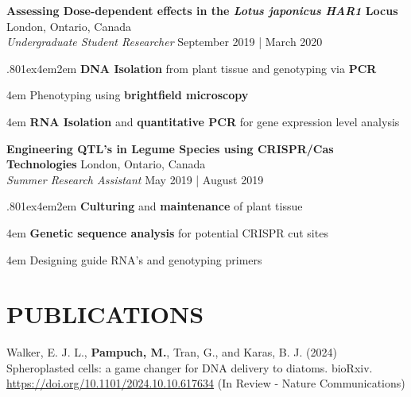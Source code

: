 \documentclass[a4paper,9pt]{extarticle}
\begin{document}
\noindent
\begin{minipage}{1\textwidth}
\setlength{\parindent}{15pt} %
	\noindent
	\textbf{Assessing Dose-dependent effects in the \textit{Lotus japonicus HAR1} Locus} \hfill London, Ontario, Canada\\ %
	\textit{Undergraduate Student Researcher}
	\hfill September 2019 | March 2020  \par %
	{\hsize.80\linewidth\parskip1ex\hangindent4em\parindent2em 
	\setlength{\parskip}{0pt} %
		\textbf{DNA Isolation} from plant tissue and genotyping via \textbf{PCR}\par
		\hangindent4em
		Phenotyping using \textbf{brightfield microscopy}\par
		\hangindent4em
		\textbf{RNA Isolation} and \textbf{quantitative PCR} for gene expression level analysis\par}
\end{minipage}
\vspace{\parskip}

\noindent
\begin{minipage}{1\textwidth}
\setlength{\parindent}{15pt} %
	\noindent
	\textbf{Engineering QTL's in Legume Species using CRISPR/Cas Technologies} \hfill London, Ontario, Canada\\ %
	\textit{Summer Research Assistant}
	\hfill May 2019 | August 2019 \par %
	{\hsize.80\linewidth\parskip1ex\hangindent4em\parindent2em 
	\setlength{\parskip}{0pt} %
		\textbf{Culturing} and \textbf{maintenance} of plant tissue \par
		\hangindent4em
		\textbf{Genetic sequence analysis} for potential CRISPR cut sites \par
		\hangindent4em
		Designing guide RNA's and genotyping primers \par}
\end{minipage}

\section*{PUBLICATIONS}

\noindent
\begin{minipage}{1\textwidth}
\setlength{\parindent}{15pt} %
	\noindent
	Walker, E. J. L., \textbf{Pampuch, M.}, Tran, G., and Karas, B. J. (2024) Spheroplasted cells: a game changer for DNA delivery to diatoms. bioRxiv. \href{https://doi.org/10.1101/2024.10.10.617634}{https://doi.org/10.1101/2024.10.10.617634} (In Review - Nature Communications) \\
\end{minipage}
\end{document}
